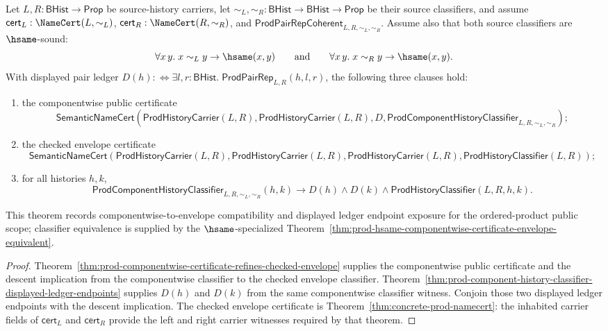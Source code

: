 \begin{theorem}
\label{thm:prod-public-object-scope-componentwise-envelope}
Let $L,R:\mathsf{BHist}\to\mathsf{Prop}$ be source-history carriers, let
$\sim_L,\sim_R:\mathsf{BHist}\to\mathsf{BHist}\to\mathsf{Prop}$ be their source
classifiers, and assume $\mathsf{cert}_L:\NameCert(L,\sim_L)$,
$\mathsf{cert}_R:\NameCert(R,\sim_R)$, and
$\mathsf{ProdPairRepCoherent}_{L,R,\sim_L,\sim_R}$. Assume also that both source
classifiers are $\hsame$-sound:
$$
\forall x\,y.\;x\sim_L y\to\hsame(x,y)
\qquad\hbox{and}\qquad
\forall x\,y.\;x\sim_R y\to\hsame(x,y).
$$
With displayed pair ledger
$D(h):\Longleftrightarrow
\exists l,r:\mathsf{BHist}.\;\mathsf{ProdPairRep}_{L,R}(h,l,r)$, the following
three clauses hold:
\begin{enumerate}
  \item the componentwise public certificate
  $$
  \mathsf{SemanticNameCert}(\mathsf{ProdHistoryCarrier}(L,R),
  \mathsf{ProdHistoryCarrier}(L,R),
  D,
  \mathsf{ProdComponentHistoryClassifier}_{L,R,\sim_L,\sim_R});
  $$
  \item the checked envelope certificate
  $$
  \mathsf{SemanticNameCert}(\mathsf{ProdHistoryCarrier}(L,R),
  \mathsf{ProdHistoryCarrier}(L,R),
  \mathsf{ProdHistoryCarrier}(L,R),
  \mathsf{ProdHistoryClassifier}(L,R));
  $$
  \item for all histories $h,k$,
  $$
  \mathsf{ProdComponentHistoryClassifier}_{L,R,\sim_L,\sim_R}(h,k)
  \to
  D(h)\land D(k)\land
  \mathsf{ProdHistoryClassifier}(L,R,h,k).
  $$
\end{enumerate}
This theorem records componentwise-to-envelope compatibility and displayed
ledger endpoint exposure for the ordered-product public scope; classifier
equivalence is supplied by the $\hsame$-specialized
Theorem~\ref{thm:prod-hsame-componentwise-certificate-envelope-equivalent}.
\end{theorem}
\begin{proof}
Theorem~\ref{thm:prod-componentwise-certificate-refines-checked-envelope}
supplies the componentwise public certificate and the descent implication from
the componentwise classifier to the checked envelope classifier.
Theorem~\ref{thm:prod-component-history-classifier-displayed-ledger-endpoints}
supplies $D(h)$ and $D(k)$ from the same componentwise classifier witness.
Conjoin those two displayed ledger endpoints with the descent implication. The
checked envelope certificate is Theorem~\ref{thm:concrete-prod-namecert}: the
inhabited carrier fields of $\mathsf{cert}_L$ and $\mathsf{cert}_R$ provide the
left and right carrier witnesses required by that theorem.
\end{proof}

